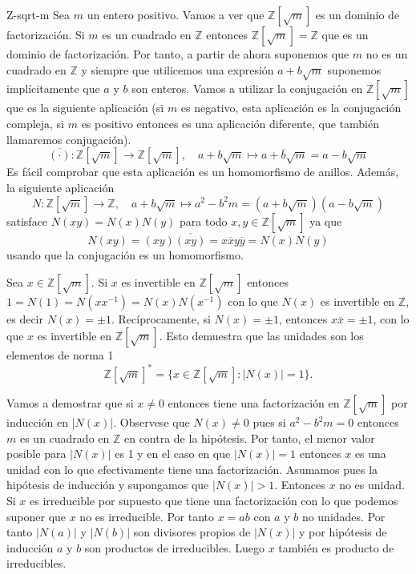 \begin{example}{}{Z-sqrt-m}
Sea \(m\) un entero positivo. Vamos a ver que \(\mathbb{Z}[\sqrt{m}]\) es un dominio de factorización. Si \(m\) es un cuadrado en \(\mathbb{Z}\) entonces \(\mathbb{Z}[\sqrt{m}] = \mathbb{Z}\) que es un dominio de factorización. Por tanto, a partir de ahora suponemos que \(m\) no es un cuadrado en \(\mathbb{Z}\) y siempre que utilicemos una expresión \(a + b\sqrt{m}\) suponemos implícitamente que \(a\) y \(b\) son enteros. Vamos a utilizar la conjugación en \(\mathbb{Z}[\sqrt{m}]\) que es la siguiente aplicación (si \(m\) es negativo, esta aplicación es la conjugación compleja, si \(m\) es positivo entonces es una aplicación diferente, que también llamaremos conjugación).
\[
\overline{(\cdot)}: \mathbb{Z}[\sqrt{m}] \to \mathbb{Z}[\sqrt{m}], \quad a + b\sqrt{m} \mapsto \overline{a + b\sqrt{m}} = a - b\sqrt{m}
\]
Es fácil comprobar que esta aplicación es un homomorfismo de anillos.  Además, la siguiente aplicación
\[
N: \mathbb{Z}[\sqrt{m}] \to \mathbb{Z}, \quad a + b\sqrt{m} \mapsto a^2 - b^2 m = (a + b\sqrt{m})(a - b\sqrt{m})
\]
satisface \(N(xy) = N(x)N(y)\) para todo \(x, y \in \mathbb{Z}[\sqrt{m}]\) ya que 
\[
N(xy) = (xy)\overline{(xy)} = x \overline{x} y \overline{y} = N(x)N(y)
\]
usando que la conjugación es un homomorfismo.

Sea \(x \in \mathbb{Z}[\sqrt{m}]\). Si \(x\) es invertible en \(\mathbb{Z}[\sqrt{m}]\) entonces \(1 = N(1) = N(xx^{-1}) = N(x)N(x^{-1})\) con lo que \(N(x)\) es invertible en \(\mathbb{Z}\), es decir \(N(x) = \pm 1\). Recíprocamente, si \(N(x) = \pm 1\), entonces \(x\overline{x} = \pm 1\), con lo que \(x\) es invertible en \(\mathbb{Z}[\sqrt{m}]\). Esto demuestra que las unidades son los elementos de norma 1
\[
\mathbb{Z}[\sqrt{m}]^* = \{x \in \mathbb{Z}[\sqrt{m}] : |N(x)| = 1\}.
\]

Vamos a demostrar que si \(x \neq 0\) entonces tiene una factorización en \(\mathbb{Z}[\sqrt{m}]\) por inducción en \(|N(x)|\). Observese que \(N(x) \neq 0\) pues si \(a^2 - b^2 m = 0\) entonces \(m\) es un cuadrado en \(\mathbb{Z}\) en contra de la hipótesis. Por tanto, el menor valor posible para \(|N(x)|\) es 1 y en el caso en que \(|N(x)| = 1\) entonces \(x\) es una unidad con lo que efectivamente tiene una factorización. Asumamos pues la hipótesis de inducción y supongamos que \(|N(x)| > 1\). Entonces \(x\) no es unidad. Si \(x\) es irreducible por supuesto que tiene una factorización con lo que podemos suponer que \(x\) no es irreducible. Por tanto \(x = ab\) con \(a\) y \(b\) no unidades. Por tanto \(|N(a)|\) y \(|N(b)|\) son divisores propios de \(|N(x)|\) y por hipótesis de inducción \(a\) y \(b\) son productos de irreducibles. Luego \(x\) también es producto de irreducibles.
\end{example}

